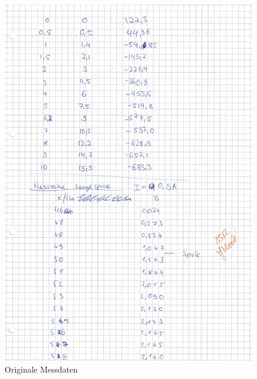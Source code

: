 \begin{figure}[h!]
  \centering
  \includegraphics[width=\textwidth]{OMD3.pdf}
  \caption{Originale Messdaten}
  \label{fig:OMD3}
\end{figure}

